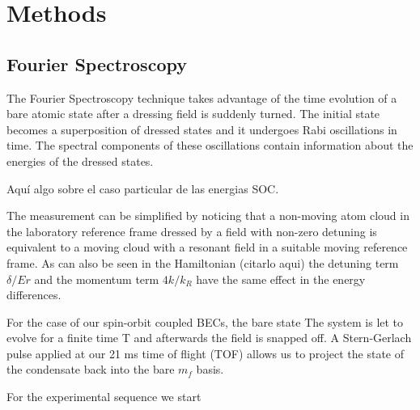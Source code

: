 \section{Methods}

\subsection{Fourier Spectroscopy}		

The Fourier Spectroscopy technique takes advantage of the time evolution of a bare atomic state after a dressing field is suddenly turned. The initial state becomes a superposition of dressed states and it undergoes Rabi oscillations in time. The spectral components of these oscillations contain information about the energies of the dressed states. 

Aquí algo sobre el caso particular de las energias SOC.

The measurement can be simplified by noticing that a non-moving atom cloud in the laboratory reference frame dressed by a field with non-zero detuning is equivalent to a moving cloud with a resonant field in a suitable moving reference frame. As can also be seen in the Hamiltonian (citarlo aqui)  the detuning term $\delta/Er$  and the momentum term $4 k/k_R$ have the same effect in the energy differences.


For the case of our spin-orbit coupled BECs, the bare state
The system is let to evolve for a finite time T and afterwards the field is snapped off. A Stern-Gerlach pulse applied at our 21 ms time of flight (TOF) allows us to project the state of the condensate back into the bare $m_f$ basis. 





For the experimental sequence we start 


